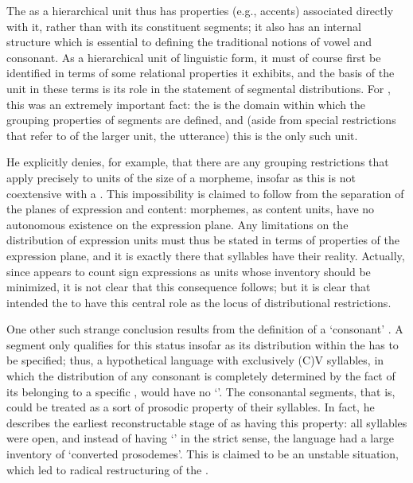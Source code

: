 The  as a hierarchical unit thus has properties (e.g.,
accents) associated directly with it, rather than with its constituent
segments; it also has an internal structure which is essential to
defining the traditional notions of vowel and consonant. As a
hierarchical unit of linguistic form, it must of course first be
identified in terms of some relational properties it exhibits, and the
basis of the unit in these terms is its role in the statement of
segmental distributions. For {\Hjelmslev}, this was an extremely
important fact: the  is the domain within which the grouping
properties of segments are defined, and (aside from special
restrictions that refer to  of the larger unit, the
utterance) this is the only such unit.

He explicitly denies, for example, that there are any grouping
restrictions that apply precisely to units of the size of a morpheme,
insofar as this is not coextensive with a . This impossibility
is claimed to follow from the separation of the planes of expression
and content: morphemes, as content units, have no autonomous existence
on the expression plane. Any limitations on the distribution of
expression units must thus be stated in terms of properties of the
expression plane, and it is exactly there that syllables have their
reality. Actually, since {\Hjelmslev} appears to count sign expressions
as units whose inventory should be minimized, it is not clear that
this consequence follows; but it is clear that {\Hjelmslev} intended the
 to have this central role as the locus of distributional
restrictions.

One other such strange conclusion results from the definition of a
`consonant' . A segment only qualifies for this status insofar as its
distribution within the  has to be specified; thus, a
hypothetical language with exclusively (C)V syllables, in which the
distribution of any consonant is completely determined by the fact of
its belonging to a specific , would have no `'. The
consonantal segments, that is, could be treated as a sort of prosodic
property of their syllables. In fact, he describes the earliest
reconstructable stage of  as having this property: all
syllables were open, and instead of having `' in the strict
sense, the language had a large inventory of `converted
prosodemes'. This is claimed to be an unstable situation, which led to
radical restructuring of the  .

